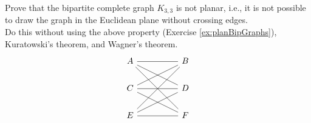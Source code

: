 \documentclass{article}
\begin{document}
\begin{exercise}
    Prove that the bipartite complete graph $K_{3,3}$ is not planar, i.e., it is not possible to draw the graph in the Euclidean plane without crossing edges.\\
    Do this without using the above property (Exercise \ref{ex:planBipGraphs}), Kuratowski's theorem, and Wagner's theorem.
    \[\begin{tikzcd}
	A && B \\
	C && D \\
	E && F
	\arrow[no head, from=1-1, to=1-3]
	\arrow[no head, from=2-3, to=1-1]
	\arrow[no head, from=1-1, to=3-3]
	\arrow[no head, from=1-3, to=2-1]
	\arrow[no head, from=1-3, to=3-1]
	\arrow[no head, from=2-1, to=2-3]
	\arrow[no head, from=3-1, to=3-3]
	\arrow[no head, from=2-1, to=3-3]
	\arrow[no head, from=2-3, to=3-1]
\end{tikzcd}\]
\end{exercise}
\end{document}
